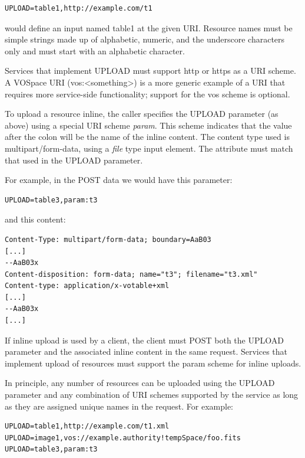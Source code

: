 \documentclass[11pt,letter]{ivoa}
\begin{document}
\begin{verbatim}
UPLOAD=table1,http://example.com/t1
\end{verbatim}

would define an input named table1 at the given URI. Resource names must be 
simple strings made up of alphabetic, numeric, and the underscore characters 
only and must start with an alphabetic character.

Services that implement UPLOAD must support http or https as a URI scheme. 
A VOSpace URI (vos:<something>)  is a 
more generic example of a URI that requires more service-side functionality; 
support for the vos scheme is optional.

To upload a resource inline, the caller specifies the UPLOAD parameter (as 
above) using a special URI scheme \emph{param}. This scheme indicates that the value 
after the colon will be the name of the inline content. The content type used is 
multipart/form-data, using a \emph{file} type input element. The  attribute 
must match that used in the UPLOAD parameter.

For example, in the POST data we would have this parameter:

\begin{verbatim}
UPLOAD=table3,param:t3
\end{verbatim}

and this content:

\begin{verbatim}
Content-Type: multipart/form-data; boundary=AaB03
[...]
--AaB03x
Content-disposition: form-data; name="t3"; filename="t3.xml"
Content-type: application/x-votable+xml
[...]
--AaB03x
[...]
\end{verbatim}

If inline upload is used by a client, the client must POST both the UPLOAD 
parameter and the associated inline content in the same request. Services that 
implement upload of resources must support the param scheme for inline uploads.

In principle, any number of resources can be uploaded using the UPLOAD parameter 
and any combination of URI schemes supported by the service as long as they are 
assigned unique names in the request. For example:

\begin{verbatim}
UPLOAD=table1,http://example.com/t1.xml
UPLOAD=image1,vos://example.authority!tempSpace/foo.fits
UPLOAD=table3,param:t3
\end{verbatim}
\end{document}

